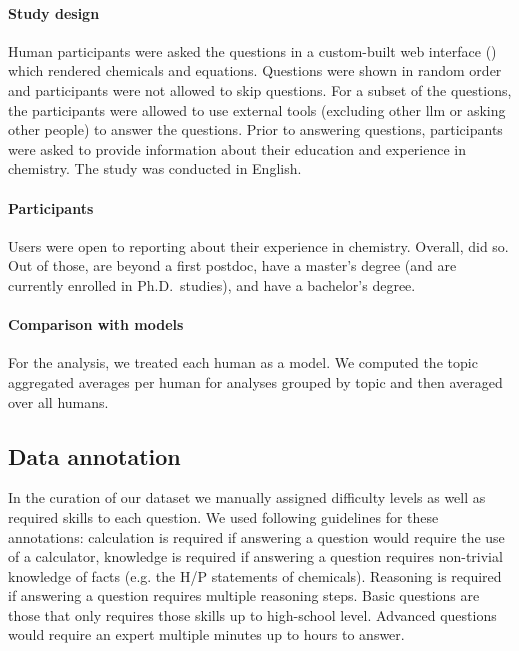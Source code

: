 \documentclass[11pt, oneside]{article}
\begin{document}
\begin{refsection}


\paragraph{Study design}
Human participants were asked the questions in a custom-built web interface () which rendered chemicals and equations. Questions were shown in random order and participants were not allowed to skip questions. For a subset of the questions, the participants were allowed to use external tools (excluding other \gls{llm} or asking other people) to answer the questions. Prior to answering questions, participants were asked to provide information about their education and experience in chemistry. The study was conducted in English.

\paragraph{Participants}
Users were open to reporting about their experience in chemistry.
Overall,  did so.
Out of those,
 are beyond a first postdoc,  have a master's degree (and are currently enrolled in Ph.D.\ studies), and  have a bachelor's degree.


\paragraph{Comparison with models}
For the analysis, we treated each human as a model. We computed the topic aggregated averages per human for analyses grouped by topic and then averaged over all humans.

\subsection{Data annotation}\label{sec:meth-topic}
In the curation of our dataset we manually assigned difficulty levels as well as required skills to each question. We used following guidelines for these annotations: calculation is required if answering a question would require the use of a calculator, knowledge is required if answering a question requires non-trivial knowledge of facts (e.g. the H/P statements of chemicals). Reasoning is required if answering a question requires multiple reasoning steps.
Basic questions are those that only requires those skills up to high-school level. Advanced questions would require an expert multiple minutes up to hours to answer.


\end{refsection}
\end{document}

